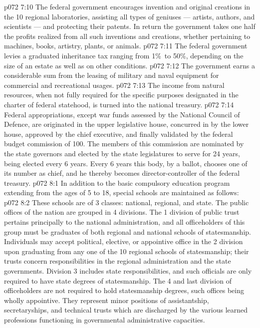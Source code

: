 \vs p072 7:10 \bibnobreakspace {} The federal government encourages invention and original creations in the 10 regional laboratories, assisting all types of geniuses --- artists, authors, and scientists --- and protecting their patents. In return the government takes one half the profits realized from all such inventions and creations, whether pertaining to machines, books, artistry, plants, or animals.
\vs p072 7:11 \bibnobreakspace {} The federal government levies a graduated inheritance tax ranging from 1\%\ to 50\%, depending on the size of an estate as well as on other conditions.
\vs p072 7:12 \bibnobreakspace {} The government earns a considerable sum from the leasing of military and naval equipment for commercial and recreational usages.
\vs p072 7:13 \bibnobreakspace {} The income from natural resources, when not fully required for the specific purposes designated in the charter of federal statehood, is turned into the national treasury.
\vs p072 7:14 \pc Federal appropriations, except war funds assessed by the National Council of Defence, are originated in the upper legislative house, concurred in by the lower house, approved by the chief executive, and finally validated by the federal budget commission of 100. The members of this commission are nominated by the state governors and elected by the state legislatures to serve for 24 years,  being elected every 6 years. Every 6 years this body, by a  ballot, chooses one of its number as chief, and he thereby becomes director\hyp{}controller of the federal treasury.
\vs p072 8:1 In addition to the basic compulsory education program extending from the ages of 5 to 18, special schools are maintained as follows:
\vs p072 8:2 \bibnobreakspace {} These schools are of 3 classes: national, regional, and state. The public offices of the nation are grouped in 4 divisions. The 1 division of public trust pertains principally to the national administration, and all officeholders of this group must be graduates of both regional and national schools of statesmanship. Individuals may accept political, elective, or appointive office in the 2 division upon graduating from any one of the 10 regional schools of statesmanship; their trusts concern responsibilities in the regional administration and the state governments. Division 3 includes state responsibilities, and such officials are only required to have state degrees of statesmanship. The 4 and last division of officeholders are not required to hold statesmanship degrees, such offices being wholly appointive. They represent minor positions of assistantship, secretaryships, and technical trusts which are discharged by the various learned professions functioning in governmental administrative capacities.
